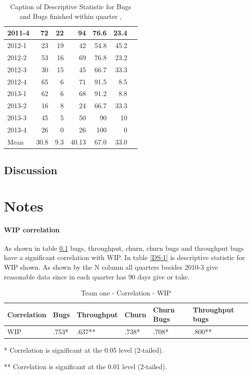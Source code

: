 \documentclass[UKenglish]{ifimaster}  %
\begin{document}
\begin{appendices}
\begin{table}[!htbp]
\begin{adjustwidth}{-2.5cm}{}
{{\begin{tabular}{ | l | r | r | r | r | r | r | }
2011-4 & 72 & 22 & 94 & 76.6& 23.4 \\ \hline
2012-1 & 23 & 19 & 42 & 54.8 & 45.2 \\ \hline
2012-2 & 53 & 16 & 69 & 76.8 & 23.2 \\ \hline
2012-3 & 30 & 15 & 45 & 66.7 & 33.3\\ \hline
2012-4 & 65 & 6 & 71 & 91.5 & 8.5 \\ \hline
2013-1 & 62 & 6 & 68 & 91.2 & 8.8 \\ \hline
2013-2 & 16 & 8 & 24 & 66.7 & 33.3 \\ \hline
2013-3 & 45 & 5 & 50 & 90 & 10 \\ \hline
2013-4 & 26 & 0 & 26 & 100 & 0 \\ \hline
Mean & 30.8&9.3&40.13&67.0&33.0 \\ \hline

\end{tabular}
}
}
\end{adjustwidth}
\caption[Optional caption for list of figures]{Caption of Descriptive Statistic for Bugs and Bugs finished within quarter  , }
\label{DS:10:5} %
\end{table}
 \end{appendices}
 
 \chapter{Discussion}
 \label{ch:discussion}

\newpage
\part{Notes}



\subsection{WIP correlation}
\label{sec:WIPC}
As shown in table \ref{corr:1} bugs, throughput, churn, churn bugs and throughput bugs have a significant correlation with WIP. In table \ref{DS:1} is descriptive statistic for WIP shown.  As shown by the N column all quarters besides 2010-3 give reasonable data since in each quarter has 90 days give or take. 

\begin{table}[!htbp] 
 \centering 
 \begin{tabular}{|l|l|l|l|l|l|} 
\hline 
Correlation  & Bugs & Throughput & Churn & Churn Bugs & Throughput bugs \\ \hline 
	WIP & .753* & .637** & .738* & .708* & .800** \\ \hline 
\end{tabular} 
 \caption{Team one - Correlation - 	WIP} 
 \label{corr:1}
    \centerline {* Correlation is significant at the 0.05 level (2-tailed).}
      \centerline{  ** Correlation is significant at the 0.01 level (2-tailed).}
 \end{table}  
 
\end{document}
